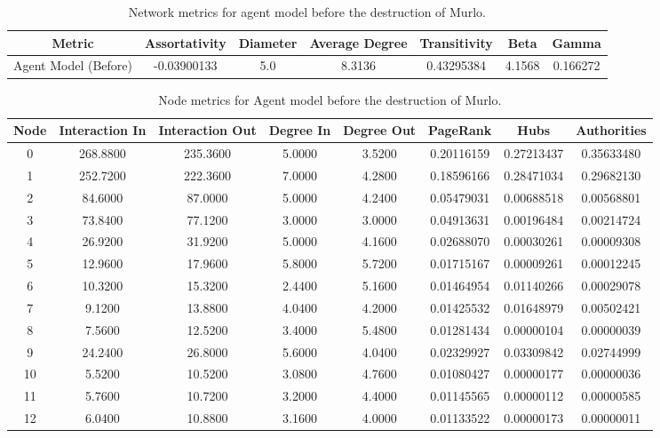 \documentclass[12pt,a4paper]{thesis}
\begin{document}
\begin{table}[H]
\centering
\caption{Network metrics for agent model before the destruction of Murlo.}
\tiny
\begin{tabular}{|c|c|c|c|c|c|c|}
\hline Metric & Assortativity & Diameter & Average Degree & Transitivity & Beta & Gamma \\ 
\hline Agent Model (Before) & -0.03900133 & 5.0	& 8.3136 & 0.43295384 & 4.1568	& 0.166272 \\ 
\hline 
\end{tabular} 
\label{tab:agentNetBefore}
\end{table}

\begin{table}[H]
\centering
\caption{Node metrics for Agent model before the destruction of Murlo.}
\tiny
\begin{tabular}{|c|c|c|c|c|c|c|c|}
\hline	Node	&	Interaction In	&	Interaction Out	&	Degree In	&	Degree Out	&	PageRank	&	Hubs	&	Authorities	\\
\hline	0	&	268.8800	&	235.3600	&	5.0000	&	3.5200	&	0.20116159	&	0.27213437	&	0.35633480	\\
\hline	1	&	252.7200	&	222.3600	&	7.0000	&	4.2800	&	0.18596166	&	0.28471034	&	0.29682130	\\
\hline	2	&	84.6000	&	87.0000	&	5.0000	&	4.2400	&	0.05479031	&	0.00688518	&	0.00568801	\\
\hline	3	&	73.8400	&	77.1200	&	3.0000	&	3.0000	&	0.04913631	&	0.00196484	&	0.00214724	\\
\hline	4	&	26.9200	&	31.9200	&	5.0000	&	4.1600	&	0.02688070	&	0.00030261	&	0.00009308	\\
\hline	5	&	12.9600	&	17.9600	&	5.8000	&	5.7200	&	0.01715167	&	0.00009261	&	0.00012245	\\
\hline	6	&	10.3200	&	15.3200	&	2.4400	&	5.1600	&	0.01464954	&	0.01140266	&	0.00029078	\\
\hline	7	&	9.1200	&	13.8800	&	4.0400	&	4.2000	&	0.01425532	&	0.01648979	&	0.00502421	\\
\hline	8	&	7.5600	&	12.5200	&	3.4000	&	5.4800	&	0.01281434	&	0.00000104	&	0.00000039	\\
\hline	9	&	24.2400	&	26.8000	&	5.6000	&	4.0400	&	0.02329927	&	0.03309842	&	0.02744999	\\
\hline	10	&	5.5200	&	10.5200	&	3.0800	&	4.7600	&	0.01080427	&	0.00000177	&	0.00000036	\\
\hline	11	&	5.7600	&	10.7200	&	3.2000	&	4.4000	&	0.01145565	&	0.00000112	&	0.00000585	\\
\hline	12	&	6.0400	&	10.8800	&	3.1600	&	4.0000	&	0.01133522	&	0.00000173	&	0.00000011	\\

\end{tabular}
\end{table}
\end{document}
